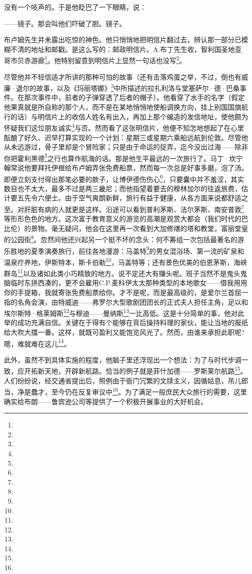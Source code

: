 \par 没有一个吱声的。于是他眨巴了一下眼睛，说：
\par ——镜子。那会叫他们吓破了胆。镜子。
\par 布卢姆先生并未露出吃惊的神色。他只悄悄地把明信片翻过去，辨认那一部分已模糊不清的地址和邮戳。是这么写的：邮政明信片。A.布丁先生收，智利国圣地亚哥市贝赤游廊\footnote{}。他特别留意到明信片上显然一句话也没写\footnote{}。
\par 尽管他并不轻信适才所讲的那种可怕的故事（还有击落鸡蛋之举，不过，倒也有威廉·退尔的故事，以及《玛丽塔娜》\footnote{}中所描述的拉扎利洛与堂塞萨尔·德·巴桑事件。在那次事件中，前者的子弹穿透了后者的帽子）。他看穿了水手的名字（假定他果真就是所自称的那个人，而不是在某地悄悄地使船调换方向，挂上别国国旗航行的话）与明信片上的收信人姓名有出入，再加上那个编造的发信地址，使他颇为怀疑我们这位朋友诚实\footnote{}与否。然而看了这张明信片，他便不知怎地想起了在心里酝酿了好久、迟早打算实现的一个计划：星期三或星期六乘船远航到伦敦。尽管他从未远游过，骨子里却是个冒险家；只是由于命运的捉弄，迄今没出过海——除非你把霍利黑德\footnote{}之行也算作航海的话。那是他生平最远的一次旅行了。马丁·坎宁翰常说他要拜托伊根给布卢姆弄张免费船票，然而每一次总是好事多磨，泡了汤。即便立刻支付得出那笔必要的款子，让博伊德伤伤心\footnote{}，只要囊中并不羞涩，其实数目也不太大，最多不过是两三畿尼；而他指望着要去的穆林加尔的往返旅费，估计要五先令六便士。由于空气爽朗新鲜，旅行有益于健康，从各方面来说都舒适之至。对肝脏有病的人就更是这样。沿途可以看到普利茅斯、法尔茅斯、南安普敦\footnote{}等形形色色的地方。这次富于教育意义的游览的高潮是观赏大都会（我们时代的巴比伦）的景物。毫无疑问，他会在这里再一次看到大加修缮的塔和教堂，富丽堂皇的公园街\footnote{}。忽然间他还兴起另一个挺不坏的念头：何不筹组一次包括最著名的游乐胜地的夏季演奏旅行，前往各地漫游：马盖特\footnote{}的男女混浴场、第一流的矿泉和温泉疗养地，伊斯特本，斯卡伯勒\footnote{}，马盖特等；还有景色优美的伯恩茅斯，海峡群岛\footnote{}以及诸如此类小巧精致的地方。说不定还大有赚头呢。班子当然不是鬼头鬼脑临时东拼西凑的，更不会雇用C.P.麦科伊太太那种类型的本地歌女——借我用用你的手提箱，我就寄张免费船票给你。才不是呢，而是最高级的，是爱尔兰首屈一指的名角会演，由特威迪——弗罗尔大型歌剧团团长的正式夫人担任主角，足以和埃尔斯特·格莱姆斯\footnote{}与穆迪——曼纳斯\footnote{}一比高低。这是十分简单的事，他对此举的成功充满自信。关键在于得有个能够在背后操持料理的家伙，能让当地的报纸给大吹大擂一番。这样，就既可盈利又能饱览风光了。然而，由谁来承担此职呢?嗯，难就难在这儿\footnote{}。
\par 此外，虽然不到具体实施的程度，他脑子里还浮现出一个想法：为了与时代步调一致，应开拓新天地，开辟新航路。恰当的例子就是菲什加德——罗斯莱尔航路\footnote{}。人们纷纷说，经交通省提出后，照例由于衙门冗繁的文牍主义，因循姑息，吊儿郎当，净是蠢才，至今仍在反复审议中\footnote{}。为了满足一般庶民大众旅行的需要，这里确实给布朗——鲁宾逊公司等提供了一个积极开展事业的大好机会。
